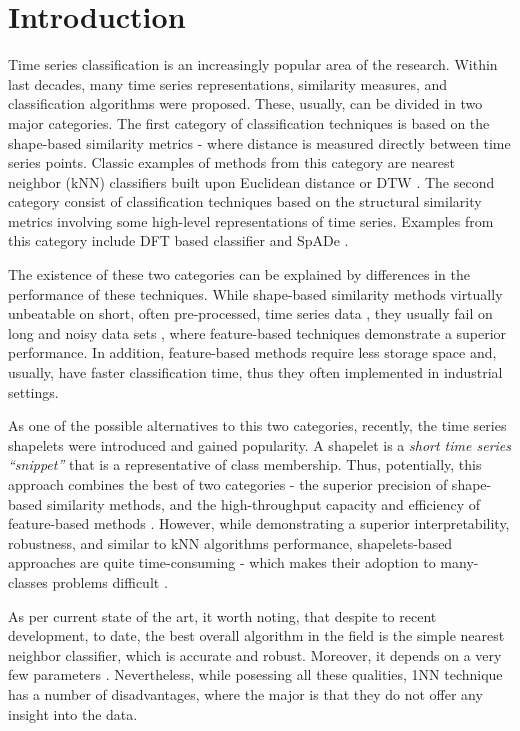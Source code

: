 \documentclass{llncs}
\begin{document}
\section{Introduction}
%
Time series classification is an increasingly popular area of the research. Within last decades,
many time series representations, similarity measures, and classification algorithms were proposed.
These, usually, can be divided in two major categories. 
The first category of classification techniques is based on the shape-based similarity metrics -
where distance is measured directly between time series points. 
Classic examples of methods from this category are nearest neighbor (kNN) classifiers
built upon Euclidean distance or DTW \cite{1NN}. 
The second category consist of classification techniques based on the structural similarity 
metrics involving some high-level representations of time series. 
Examples from this category include DFT based classifier \cite{DFT} and SpADe \cite{spade}. 

The existence of these two categories can be explained by differences in the performance of these
techniques. While shape-based similarity methods virtually unbeatable on short, often pre-processed,
time series data \cite{benchmark}, they usually fail on long and noisy data sets \cite{indexing},
where feature-based techniques demonstrate a superior performance. 
In addition, feature-based methods require less storage space and, usually, have faster
classification time, thus they often implemented in industrial settings. 

As one of the possible alternatives to this two categories, recently, the time series shapelets
were introduced \cite{shapelet} and gained popularity. A shapelet is a \textit{short time series 
``snippet''} that is a representative of class membership. Thus, potentially, this approach combines
the best of two categories - the superior precision of shape-based similarity methods, and the
high-throughput capacity and efficiency of feature-based methods \cite{logical}. However, while
demonstrating a superior interpretability, robustness, and similar to kNN algorithms performance,
shapelets-based approaches are quite time-consuming - which makes their adoption to many-classes
problems difficult \cite{bagnal}. 

As per current state of the art, it worth noting, that despite to recent development, to date, the
best overall algorithm in the field is the simple nearest neighbor classifier, which is accurate
and robust. Moreover, it depends on a very few parameters \cite{benchmark} \cite{comparison}
\cite{classifiers}. Nevertheless, while posessing all these qualities, 1NN
technique has a number of disadvantages, where the major is that they do not offer any 
insight into the data.
\end{document}
